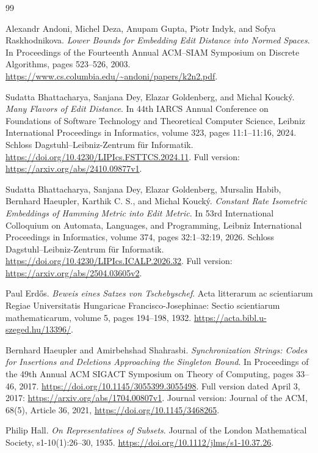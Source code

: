 \begin{thebibliography}{99}

Alexandr Andoni, Michel Deza, Anupam Gupta, Piotr Indyk, and Sofya
Raskhodnikova.
\emph{Lower Bounds for Embedding Edit Distance into Normed Spaces}.
In Proceedings of the Fourteenth Annual ACM--SIAM Symposium on
Discrete Algorithms, pages 523--526, 2003.
\url{https://www.cs.columbia.edu/~andoni/papers/k2n2.pdf}.

Sudatta Bhattacharya, Sanjana Dey, Elazar Goldenberg, and Michal Kouck\'y.
\emph{Many Flavors of Edit Distance}.
In 44th IARCS Annual Conference on Foundations of Software Technology
and Theoretical Computer Science, Leibniz International Proceedings in
Informatics, volume 323, pages 11:1--11:16, 2024.
Schloss Dagstuhl--Leibniz-Zentrum f\"ur Informatik.
\url{https://doi.org/10.4230/LIPIcs.FSTTCS.2024.11}.
Full version: \url{https://arxiv.org/abs/2410.09877v1}.

Sudatta Bhattacharya, Sanjana Dey, Elazar Goldenberg, Mursalin Habib,
Bernhard Haeupler, Karthik C. S., and Michal Kouck\'y.
\emph{Constant Rate Isometric Embeddings of Hamming Metric into Edit Metric}.
In 53rd International Colloquium on Automata, Languages, and Programming,
Leibniz International Proceedings in Informatics, volume 374,
pages 32:1--32:19, 2026.
Schloss Dagstuhl--Leibniz-Zentrum f\"ur Informatik.
\url{https://doi.org/10.4230/LIPIcs.ICALP.2026.32}.
Full version: \url{https://arxiv.org/abs/2504.03605v2}.

Paul Erd\H{o}s.
\emph{Beweis eines Satzes von Tschebyschef}.
Acta litterarum ac scientiarum Regiae Universitatis Hungaricae
Francisco-Josephinae: Sectio scientiarum mathematicarum,
volume 5, pages 194--198, 1932.
\url{https://acta.bibl.u-szeged.hu/13396/}.

Bernhard Haeupler and Amirbehshad Shahrasbi.
\emph{Synchronization Strings: Codes for Insertions and Deletions
Approaching the Singleton Bound}.
In Proceedings of the 49th Annual ACM SIGACT Symposium on Theory of
Computing, pages 33--46, 2017.
\url{https://doi.org/10.1145/3055399.3055498}.
Full version dated April 3, 2017:
\url{https://arxiv.org/abs/1704.00807v1}.
Journal version: Journal of the ACM, 68(5), Article 36, 2021,
\url{https://doi.org/10.1145/3468265}.

Philip Hall.
\emph{On Representatives of Subsets}.
Journal of the London Mathematical Society, s1-10(1):26--30, 1935.
\url{https://doi.org/10.1112/jlms/s1-10.37.26}.


\end{thebibliography}
